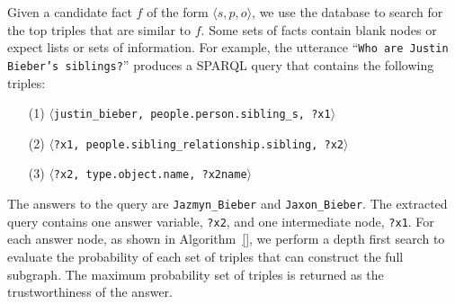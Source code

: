 Given a candidate fact \(f\) of the form \(\langle s, p, o \rangle\), we use the
database to search for the top triples that are similar to \(f\).
Some sets of facts contain blank nodes or expect lists or sets of information.
For example, the utterance ``\texttt{Who are Justin Bieber's siblings?}'' produces 
a SPARQL query that contains the following triples: 
\begin{enumerate}
\item[(1)] \(\langle\)\texttt{justin\_bieber, people.person.sibling\_s, ?x1}\(\rangle\)
\item[(2)] \(\langle\)\texttt{?x1, people.sibling\_relationship.sibling, ?x2}\(\rangle\)
\item[(3)] \(\langle\)\texttt{?x2, type.object.name, ?x2name}\(\rangle\)
\end{enumerate}

The answers to the query are \texttt{Jazmyn\_Bieber} and \texttt{Jaxon\_Bieber}.
The extracted query contains one answer variable, \texttt{?x2}, and one intermediate node, \texttt{?x1}.
For each answer node, as shown in Algorithm~\ref{}, we perform a depth first
search to evaluate the probability of each set of triples that can construct
the full subgraph.
The maximum probability set of triples is returned as the trustworthiness of the answer.



